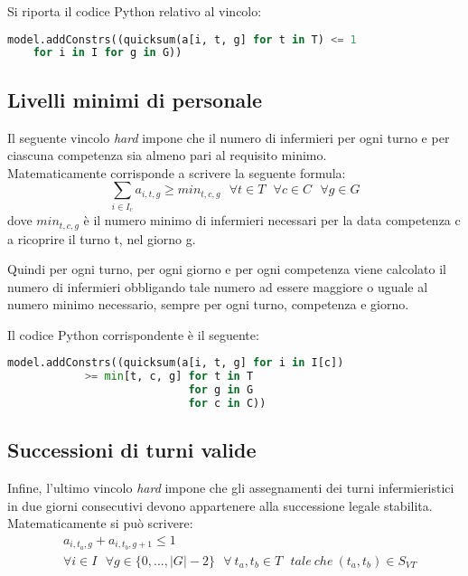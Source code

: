 Si riporta il codice Python relativo al vincolo:
\begin{lstlisting}[language=Python]
model.addConstrs((quicksum(a[i, t, g] for t in T) <= 1 
	for i in I for g in G))
\end{lstlisting}


\subsection{Livelli minimi di personale}
Il seguente vincolo \textit{hard} impone che il numero di infermieri per ogni turno e per ciascuna competenza sia almeno pari al requisito minimo. \\
Matematicamente corrisponde a scrivere la seguente formula:
\begin{equation}
\sum_{i \in I_c} a_{i,t,g} \geq min_{t,c,g} ~~~ \forall t \in T ~~~ \forall c \in C ~~~ \forall g \in G
\end{equation}
dove $min_{t,c,g}$ è il numero minimo di infermieri necessari per la data competenza c a ricoprire il turno t, nel giorno g.

Quindi per ogni turno, per ogni giorno e per ogni competenza viene calcolato il numero di infermieri obbligando tale numero ad essere maggiore o uguale al numero minimo necessario, sempre per ogni turno, competenza e giorno.

Il codice Python corrispondente è il seguente:
\begin{lstlisting}[language=Python]
model.addConstrs((quicksum(a[i, t, g] for i in I[c]) 
			>= min[t, c, g] for t in T
							for g in G
							for c in C))
\end{lstlisting}

\subsection{Successioni di turni valide}
Infine, l'ultimo vincolo \textit{hard} impone che gli assegnamenti dei turni infermieristici in due giorni consecutivi devono appartenere alla successione legale stabilita.
Matematicamente si può scrivere:
\begin{equation}
\begin{split}
&a_{i, t_{a}, g} + a_{i, t_{b}, g+1} \leq 1 \\
&\forall i \in I ~~~ \forall g \in \{0,...,|G| - 2\} ~~~ \forall ~ t_{a}, t_{b} \in T ~~~ tale ~ che ~ (t_{a}, t_{b}) \in S_{VT} \\
\end{split}
\end{equation}

